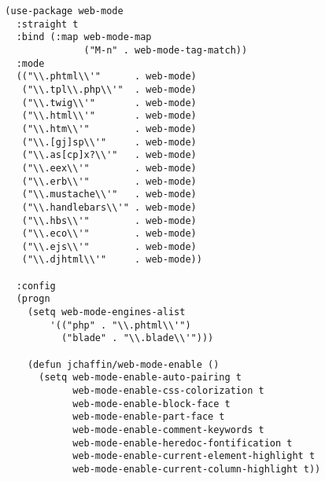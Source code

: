 \documentclass[11pt]{article}
\begin{document}
\begin{verbatim}
  (use-package web-mode
    :straight t
    :bind (:map web-mode-map
                ("M-n" . web-mode-tag-match))
    :mode
    (("\\.phtml\\'"      . web-mode)
     ("\\.tpl\\.php\\'"  . web-mode)
     ("\\.twig\\'"       . web-mode)
     ("\\.html\\'"       . web-mode)
     ("\\.htm\\'"        . web-mode)
     ("\\.[gj]sp\\'"     . web-mode)
     ("\\.as[cp]x?\\'"   . web-mode)
     ("\\.eex\\'"        . web-mode)
     ("\\.erb\\'"        . web-mode)
     ("\\.mustache\\'"   . web-mode)
     ("\\.handlebars\\'" . web-mode)
     ("\\.hbs\\'"        . web-mode)
     ("\\.eco\\'"        . web-mode)
     ("\\.ejs\\'"        . web-mode)
     ("\\.djhtml\\'"     . web-mode))

    :config
    (progn
      (setq web-mode-engines-alist
          '(("php" . "\\.phtml\\'")
            ("blade" . "\\.blade\\'")))

      (defun jchaffin/web-mode-enable ()
        (setq web-mode-enable-auto-pairing t
              web-mode-enable-css-colorization t
              web-mode-enable-block-face t
              web-mode-enable-part-face t
              web-mode-enable-comment-keywords t
              web-mode-enable-heredoc-fontification t
              web-mode-enable-current-element-highlight t
              web-mode-enable-current-column-highlight t))


\end{verbatim}
\end{document}
